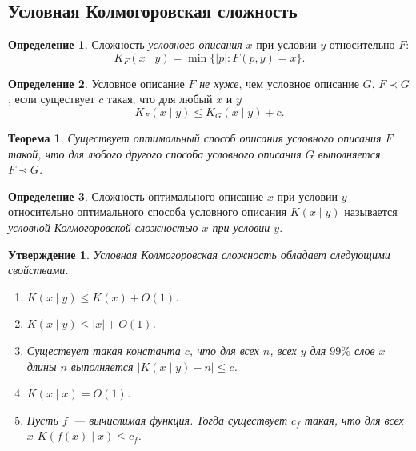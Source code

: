 \documentclass[12pt]{article}
\theoremstyle{definition}
\newtheorem{definition}{Определение}[section]
\theoremstyle{plain}
\newtheorem{theorem}{Теорема}[section]
\newtheorem{statement}{Утверждение}[section]
\theoremstyle{remark}
\begin{document}
\subsection{Условная Колмогоровская сложность}
\begin{definition} Сложность \emph{условного описания} $x$ при условии $y$ относительно $F$:
    \[K_F(x\mid y) = \min\{|p| : F(p,y) = x\}.\]
\end{definition}
\begin{definition} Условное описание $F$ \emph{не хуже}, чем условное описание $G$,
    $F\prec G$, если существует $c$ такая, что для любый $x$ и $y$
    \[
        K_F(x\mid y)\le K_G(x\mid y) + c.
    \]
\end{definition}
\begin{theorem}
    Существует оптимальный способ описания условного описания $F$ такой, что для любого
    другого способа условного описания $G$ выполняется $F\prec G$.  
\end{theorem}
\begin{definition}
    Сложность оптимального описание $x$ при условии $y$ относительно оптимального способа условного описания
    $K(x\mid y)$ называется \emph{условной Колмогоровской сложностью $x$ при условии $y$}.
\end{definition}
\begin{statement}
    Условная Колмогоровская сложность обладает следующими свойствами.
\begin{enumerate}
    \item $K(x\mid y)\le K(x) + O(1)$.
    \item $K(x\mid y)\le |x| + O(1)$.
    \item Существует такая константа $c$, что для всех $n$, всех $y$ для $99\%$
        слов $x$ длины $n$ выполняется \(|K(x\mid y) - n|\le c\).
    \item $K(x\mid x) = O(1)$.
    \item Пусть $f$~--- вычислимая функция. Тогда существует $c_f$ такая, что
        для всех $x$ $K(f(x)\mid x)\le c_f$. 
\end{enumerate}
\end{statement}
\end{document}
